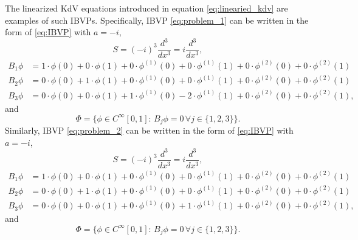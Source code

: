 \documentclass[12pt, oneside, a4paper]{article}
\begin{document}
The linearized KdV equations introduced in equation \eqref{eq:linearied_kdv} are examples of such IBVPs. Specifically, IBVP \eqref{eq:problem_1} can be written in the form of \eqref{eq:IBVP} with $a=-i$,
\[S = (-i)^3 \frac{d^3}{dx^3} = i\frac{d^3}{dx^3},\]
\begin{align*}
    B_1 \phi &= 1\cdot\phi(0) + 0\cdot\phi(1) + 0\cdot\phi^{(1)}(0) + 0\cdot\phi^{(1)}(1) + 0\cdot\phi^{(2)}(0) + 0\cdot\phi^{(2)}(1)\\
    B_2 \phi &= 0\cdot\phi(0) + 1\cdot\phi(1) + 0\cdot\phi^{(1)}(0) + 0\cdot\phi^{(1)}(1) + 0\cdot\phi^{(2)}(0) + 0\cdot\phi^{(2)}(1)\\
    B_3 \phi &= 0\cdot\phi(0) + 0\cdot\phi(1) + 1\cdot\phi^{(1)}(0) - 2\cdot\phi^{(1)}(1) + 0\cdot\phi^{(2)}(0) + 0\cdot\phi^{(2)}(1),
\end{align*}
and 
\[\Phi = \{\phi\in C^{\infty}[0,1]:\, B_j\phi = 0\,\forall j\in\{1,2,3\}\}.\]
Similarly, IBVP \eqref{eq:problem_2} can be written in the form of \eqref{eq:IBVP} with $a=-i$,
\[S = (-i)^3 \frac{d^3}{dx^3} = i\frac{d^3}{dx^3},\]
\begin{align*}
    B_1 \phi &= 1\cdot\phi(0) + 0\cdot\phi(1) + 0\cdot\phi^{(1)}(0) + 0\cdot\phi^{(1)}(1) + 0\cdot\phi^{(2)}(0) + 0\cdot\phi^{(2)}(1)\\
    B_2 \phi &= 0\cdot\phi(0) + 1\cdot\phi(1) + 0\cdot\phi^{(1)}(0) + 0\cdot\phi^{(1)}(1) + 0\cdot\phi^{(2)}(0) + 0\cdot\phi^{(2)}(1)\\
    B_3 \phi &= 0\cdot\phi(0) + 0\cdot\phi(1) + 0\cdot\phi^{(1)}(0) + 1\cdot\phi^{(1)}(1) + 0\cdot\phi^{(2)}(0) + 0\cdot\phi^{(2)}(1),
\end{align*}
and 
\[\Phi = \{\phi\in C^{\infty}[0,1]:\, B_j\phi = 0\,\forall j\in\{1,2,3\}\}.\]

\end{document}
